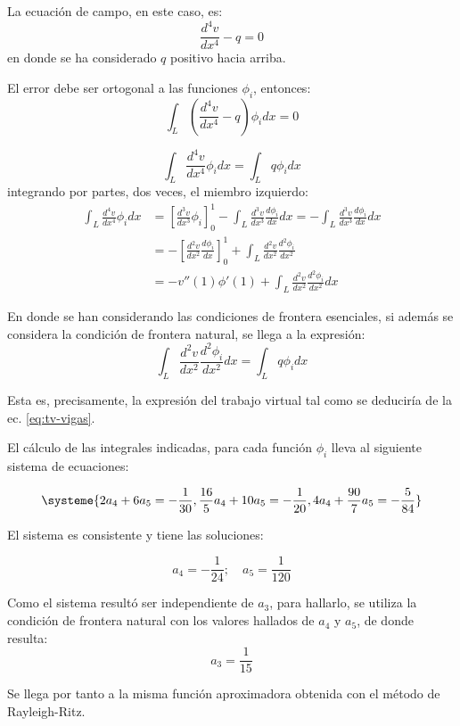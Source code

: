 \begin{example}
\begin{itemize}
	La ecuación de campo, en este caso, es:
	\[ \frac{d^4v}{dx^4} - q = 0 \]
	en donde se ha considerado $q$ positivo hacia arriba.
	
	El error debe ser ortogonal a las funciones $\phi_i$, entonces:
	\[ \int_L \left( \frac{d^4v}{dx^4} - q \right) \phi_i dx = 0\]
	
	\[ \int_L \frac{d^4v}{dx^4} \phi_i dx = \int_L q \phi_i dx  \]
	integrando por partes, dos veces, el miembro izquierdo:
	\[ \begin{split}
		\int_L \frac{d^4v}{dx^4} \phi_i dx &= \left[ \frac{d^3v}{dx^3} \phi_i \right]_0^1 - 
	\int_L \frac{d^3v}{dx^3} \frac{d\phi_i}{dx} dx = - \int_L \frac{d^3v}{dx^3} \frac{d\phi_i}{dx} dx \\
	&= -\left[\frac{d^2v}{dx^2} \frac{d\phi_i}{dx}\right]_0^1 + \int_L \frac{d^2v}{dx^2} 
	\frac{d^2\phi_i}{dx^2}\\
	&= -v''(1) \phi'(1) + \int_L \frac{d^2v}{dx^2} \frac{d^2\phi_i}{dx^2}dx
	\end{split} \]

	En donde se han considerando las condiciones de frontera esenciales, si además
	se considera la condición de frontera natural, se llega a la expresión:
	\[ \int_L \frac{d^2v}{dx^2} \frac{d^2\phi_i}{dx^2}dx = \int_L q \phi_i dx \]

	Esta es, precisamente, la expresión del trabajo virtual tal como se deduciría de la
	ec. \eqref{eq:tv-vigas}.

	El cálculo de las integrales indicadas, para cada función $\phi_i$ lleva al siguiente
	sistema de ecuaciones:

	\[ \systeme{2a_4 + 6a_5 = -\frac{1}{30},
	\frac{16}{5}a_{4} + 10 a_{5} = - \frac{1}{20},
	4 a_{4} + \frac{90}{7}a_{5} = -\frac{5}{84}}\]

	El sistema es consistente y tiene las soluciones:

	\[ a_4 = -\frac{1}{24}; \quad a_5 = \frac{1}{120} \]

	Como el sistema resultó ser independiente de $a_3$, para hallarlo, se utiliza la condición de 
	frontera natural con los valores hallados de $a_4$ y $a_5$, de donde resulta:
	\[a_3 = \frac{1}{15} \]

	Se llega por tanto a la misma función aproximadora obtenida con el método de 
	Rayleigh-Ritz.
	
\end{itemize}
	
\end{example}